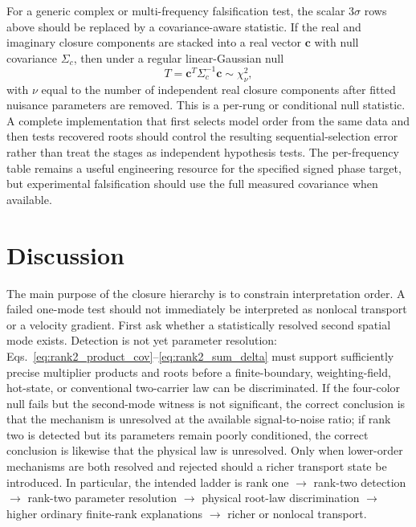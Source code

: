 \documentclass[11pt]{article}
\begin{document}
For a generic complex or multi-frequency falsification test, the scalar $3\sigma$ rows above should be replaced by a covariance-aware statistic. If the real and imaginary closure components are stacked into a real vector $\mathbf c$ with null covariance $\Sigma_c$, then under a regular linear-Gaussian null
\begin{equation}
\boxed{T=\mathbf c^{T}\Sigma_c^{-1}\mathbf c\sim\chi^2_{\nu},}
\label{eq:complex_closure_stat}
\end{equation}
with $\nu$ equal to the number of independent real closure components after fitted nuisance parameters are removed. This is a per-rung or conditional null statistic. A complete implementation that first selects model order from the same data and then tests recovered roots should control the resulting sequential-selection error rather than treat the stages as independent hypothesis tests. The per-frequency table remains a useful engineering resource for the specified signed phase target, but experimental falsification should use the full measured covariance when available.

\section{Discussion}

The main purpose of the closure hierarchy is to constrain interpretation order. A failed one-mode test should not immediately be interpreted as nonlocal transport or a velocity gradient. First ask whether a statistically resolved second spatial mode exists. Detection is not yet parameter resolution: Eqs.~\eqref{eq:rank2_product_cov}--\eqref{eq:rank2_sum_delta} must support sufficiently precise multiplier products and roots before a finite-boundary, weighting-field, hot-state, or conventional two-carrier law can be discriminated. If the four-color null fails but the second-mode witness is not significant, the correct conclusion is that the mechanism is unresolved at the available signal-to-noise ratio; if rank two is detected but its parameters remain poorly conditioned, the correct conclusion is likewise that the physical law is unresolved. Only when lower-order mechanisms are both resolved and rejected should a richer transport state be introduced. In particular, the intended ladder is rank one $\rightarrow$ rank-two detection $\rightarrow$ rank-two parameter resolution $\rightarrow$ physical root-law discrimination $\rightarrow$ higher ordinary finite-rank explanations $\rightarrow$ richer or nonlocal transport.
\end{document}
